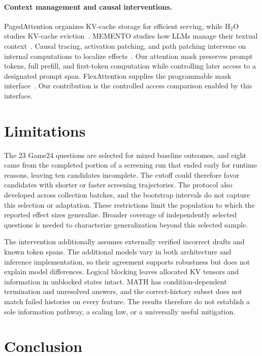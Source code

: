\documentclass{article}
\begin{document}
\paragraph{Context management and causal interventions.}
PagedAttention organizes KV-cache storage for efficient serving, while H$_2$O studies KV-cache eviction~\citep{kwon2023pagedattention,zhang2023h2o}. MEMENTO studies how LLMs manage their textual context~\citep{kontonis2026memento}. Causal tracing, activation patching, and path patching intervene on internal computations to localize effects~\citep{meng2022causaltracing,zhang2024activationpatching,goldowsky2023pathpatching,dura2026sequentialpatching}. Our attention mask preserves prompt tokens, full prefill, and first-token computation while controlling later access to a designated prompt span. FlexAttention supplies the programmable mask interface~\citep{dong2025flexattention}. Our contribution is the controlled access comparison enabled by this interface.

\section{Limitations}

The 23 Game24 questions are selected for mixed baseline outcomes, and eight came from the completed portion of a screening run that ended early for runtime reasons, leaving ten candidates incomplete. The cutoff could therefore favor candidates with shorter or faster screening trajectories. The protocol also developed across collection batches, and the bootstrap intervals do not capture this selection or adaptation. These restrictions limit the population to which the reported effect sizes generalize. Broader coverage of independently selected questions is needed to characterize generalization beyond this selected sample.

The intervention additionally assumes externally verified incorrect drafts and known token spans. The additional models vary in both architecture and inference implementation, so their agreement supports robustness but does not explain model differences. Logical blocking leaves allocated KV tensors and information in unblocked states intact. MATH has condition-dependent termination and unresolved answers, and the correct-history subset does not match failed histories on every feature. The results therefore do not establish a sole information pathway, a scaling law, or a universally useful mitigation.

\section{Conclusion}
\end{document}
